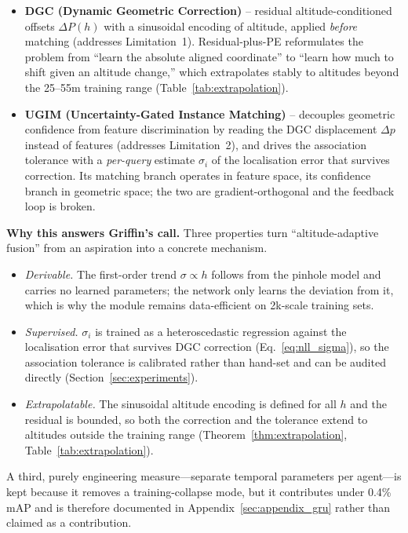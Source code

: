 \documentclass[9.5pt,twocolumn,a4paper]{IEEEtran}
\begin{document}
\begin{itemize}
    \item \textbf{DGC (Dynamic Geometric Correction)} -- residual altitude-conditioned offsets $\Delta P(h)$ with a sinusoidal encoding of altitude, applied \emph{before} matching (addresses Limitation~1). Residual-plus-PE reformulates the problem from ``learn the absolute aligned coordinate'' to ``learn how much to shift given an altitude change,'' which extrapolates stably to altitudes beyond the 25--55m training range (Table~\ref{tab:extrapolation}).
    \item \textbf{UGIM (Uncertainty-Gated Instance Matching)} -- decouples geometric confidence from feature discrimination by reading the DGC displacement $\Delta p$ instead of features (addresses Limitation~2), and drives the association tolerance with a \emph{per-query} estimate $\sigma_i$ of the localisation error that survives correction. Its matching branch operates in feature space, its confidence branch in geometric space; the two are gradient-orthogonal and the feedback loop is broken.
\end{itemize}

\noindent\textbf{Why this answers Griffin's call.} Three properties turn ``altitude-adaptive fusion'' from an aspiration into a concrete mechanism.

\begin{itemize}
    \item \emph{Derivable.} The first-order trend $\sigma \propto h$ follows from the pinhole model and carries no learned parameters; the network only learns the deviation from it, which is why the module remains data-efficient on 2k-scale training sets.
    \item \emph{Supervised.} $\sigma_i$ is trained as a heteroscedastic regression against the localisation error that survives DGC correction (Eq.~\ref{eq:nll_sigma}), so the association tolerance is calibrated rather than hand-set and can be audited directly (Section~\ref{sec:experiments}).
    \item \emph{Extrapolatable.} The sinusoidal altitude encoding is defined for all $h$ and the residual is bounded, so both the correction and the tolerance extend to altitudes outside the training range (Theorem~\ref{thm:extrapolation}, Table~\ref{tab:extrapolation}).
\end{itemize}

A third, purely engineering measure---separate temporal parameters per agent---is kept because it removes a training-collapse mode, but it contributes under 0.4\% mAP and is therefore documented in Appendix~\ref{sec:appendix_gru} rather than claimed as a contribution.
\end{document}

